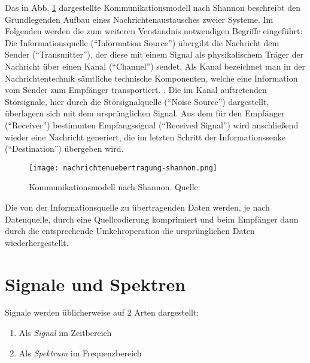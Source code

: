 Das in Abb. \ref{nachrichtenuebertragung} dargestellte Kommunikationsmodell nach Shannon beschreibt den Grundlegenden Aufbau eines Nachrichtenaustausches zweier Systeme. 
Im Folgenden werden die zum weiteren Verständnis notwendigen Begriffe eingeführt:\newline
Die Informationsquelle (\enquote{Information Source}) übergibt die Nachricht dem Sender (\enquote{Transmitter}), der diese mit einem Signal als physikalischem Träger der Nachricht über einen Kanal (\enquote{Channel}) sendet. \newline
Als Kanal bezeichnet man in der Nachrichtentechnik sämtliche technische Komponenten, welche eine Information vom Sender zum Empfänger transportiert. \cite[vgl. Dankmeier, S. 13]{Dankmeier:2017}.\newline
Die im Kanal auftretenden Störsignale, hier durch die Störsignalquelle (\enquote{Noise Source}) dargestellt, überlagern sich mit dem ursprünglichen Signal.\newline
Aus dem für den Empfänger (\enquote{Receiver}) bestimmten Empfangssignal (\enquote{Received Signal}) wird anschließend wieder eine Nachricht generiert, die im letzten Schritt der Informationssenke (\enquote{Destination}) übergeben wird.

\begin{figure}[ht]
	\centering
	\texttt{[image: nachrichtenuebertragung-shannon.png]}
	\caption[Kommunikationsmodell nach Shannon]{Kommunikationsmodell nach Shannon. Quelle: \cite[Werner, S. 11f]{Werner:2017}} 
	\label{nachrichtenuebertragung}
\end{figure}

Die von der Informationsquelle zu übertragenden Daten werden, je nach Datenquelle, durch eine Quellcodierung komprimiert und beim Empfänger dann durch die entsprechende Umkehroperation die ursprünglichen Daten wiederhergestellt.




\newpage
\section{Signale und Spektren}
Signale werden üblicherweise auf 2 Arten dargestellt:
\begin{enumerate}
	\item Als \textit{Signal} im Zeitbereich
	\item Als \textit{Spektrum} im Frequenzbereich
\end{enumerate}




